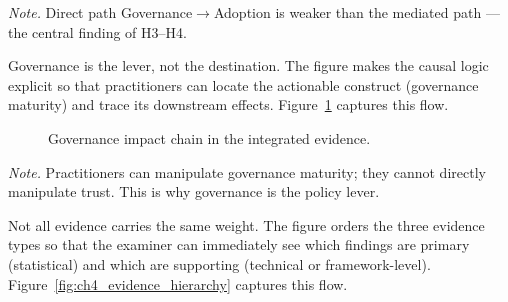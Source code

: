 \vspace{0.3em}\noindent\textit{Note.} Direct path Governance$\rightarrow$Adoption is weaker than the mediated path --- the central finding of H3--H4.



\noindent Governance is the lever, not the destination. The figure makes the causal logic explicit so that practitioners can locate the actionable construct (governance maturity) and trace its downstream effects. Figure~\ref{fig:ch4_governance_impact} captures this flow.

\begin{figure}[!htbp]
\centering
{}
\caption[Governance impact chain in the integrated evidence]{Governance impact chain in the integrated evidence.}
\label{fig:ch4_governance_impact}
\end{figure}

\vspace{0.3em}\noindent\textit{Note.} Practitioners can manipulate governance maturity; they cannot directly manipulate trust. This is why governance is the policy lever.



\noindent Not all evidence carries the same weight. The figure orders the three evidence types so that the examiner can immediately see which findings are primary (statistical) and which are supporting (technical or framework-level). Figure~\ref{fig:ch4_evidence_hierarchy} captures this flow.

